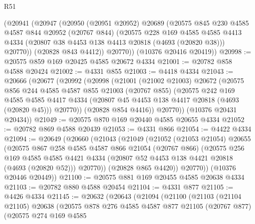\begin{lexlean}{R51}
\begin{coremodule}
      (@20941
        (@20947
          (@20950
            (@20951 @20952)
            @20689
            (@20575
              @845
              @230
              @4585
              @4587
              @844
              @20952
              (@20767 @844)
              (@20575
                @228
                @169
                @4585
                @4585
                @4413
                @4334
                (@20807 @38 @4453 @138 @4413 @20818 (@4693 (@20820 @38)))
                @20770))
            (@20828 @843 @4412))
          @20770))
      (@10376 @20416 @20419))
@20998 := @20575 @859 @169 @20425 @4585 @20672 @4334
@21001 := @20782 @858 @4588 @20424
@21002 := @4331 @855
@21003 := @4418 @4334
@21043 := @20666
    (@20677
      (@20992
        (@20998
          (@21001
            (@21002 @21003)
            @20672
            (@20575
              @856
              @244
              @4585
              @4587
              @855
              @21003
              (@20767 @855)
              (@20575
                @242
                @169
                @4585
                @4585
                @4417
                @4334
                (@20807 @45 @4453 @138 @4417 @20818 (@4693 (@20820 @45)))
                @20770))
            (@20828 @854 @4416))
          @20770))
      (@10376 @20431 @20434))
@21049 := @20575 @870 @169 @20440 @4585 @20655 @4334
@21052 := @20782 @869 @4588 @20439
@21053 := @4331 @866
@21054 := @4422 @4334
@21094 := @20649
    (@20660
      (@21043
        (@21049
          (@21052
            (@21053 @21054)
            @20655
            (@20575
              @867
              @258
              @4585
              @4587
              @866
              @21054
              (@20767 @866)
              (@20575
                @256
                @169
                @4585
                @4585
                @4421
                @4334
                (@20807 @52 @4453 @138 @4421 @20818 (@4693 (@20820 @52)))
                @20770))
            (@20828 @865 @4420))
          @20770))
      (@10376 @20446 @20449))
@21100 := @20575 @881 @169 @20455 @4585 @20638 @4334
@21103 := @20782 @880 @4588 @20454
@21104 := @4331 @877
@21105 := @4426 @4334
@21145 := @20632
    (@20643
      (@21094
        (@21100
          (@21103
            (@21104 @21105)
            @20638
            (@20575
              @878
              @276
              @4585
              @4587
              @877
              @21105
              (@20767 @877)
              (@20575
                @274
                @169
                @4585

\end{coremodule}
\end{lexlean}
